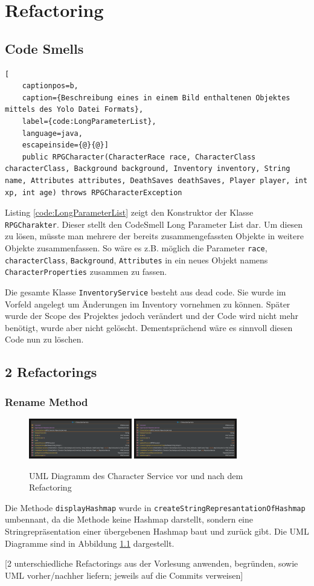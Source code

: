 \chapter{Refactoring}

\section{Code Smells}
\begin{lstlisting}[
	captionpos=b,
	caption={Beschreibung eines in einem Bild enthaltenen Objektes mittels des Yolo Datei Formats},
	label={code:LongParameterList},
	language=java,
	escapeinside={@}{@}]
	public RPGCharacter(CharacterRace race, CharacterClass characterClass, Background background, Inventory inventory, String name, Attributes attributes, DeathSaves deathSaves, Player player, int xp, int age) throws RPGCharacterException
\end{lstlisting}
Listing \ref{code:LongParameterList} zeigt den Konstruktor der Klasse \texttt{RPGCharakter}. Dieser stellt den CodeSmell Long Parameter List dar. Um diesen zu lösen, müsste man mehrere der bereits zusammengefassten Objekte in weitere Objekte zusammenfassen. So wäre es z.B. möglich die Parameter \texttt{race}, \texttt{characterClass}, \texttt{Background}, \texttt{Attributes} in ein neues Objekt namens \texttt{CharacterProperties} zusammen zu fassen.

Die gesamte Klasse \texttt{InventoryService} besteht aus dead code. Sie wurde im Vorfeld angelegt um Änderungen im Inventory vornehmen zu können. Später wurde der Scope des Projektes jedoch verändert und der Code wird nicht mehr benötigt, wurde aber nicht gelöscht. Dementsprächend wäre es sinnvoll diesen Code nun zu löschen.

\section{2 Refactorings}
\subsection{Rename Method}
\begin{figure}[H]
	\centering
	\includegraphics[width=0.4\textwidth]{Bilder/CharacterService-old.pdf}
	\includegraphics[width=0.4\textwidth]{Bilder/CharacterService.pdf}
	\caption{UML Diagramm des Character Service vor und nach dem Refactoring}
	\label{fig:rename}
\end{figure}
Die Methode \texttt{displayHashmap} wurde in \texttt{createStringRepresantationOfHashmap} umbennant, da die Methode keine Hashmap darstellt, sondern eine Stringrepräsentation einer übergebenen Hashmap baut und zurück gibt. Die UML Diagramme sind in Abbildung \ref{fig:rename} dargestellt.

[2 unterschiedliche Refactorings aus der Vorlesung anwenden, begründen, sowie UML vorher/nachher liefern; jeweils auf die Commits verweisen]
